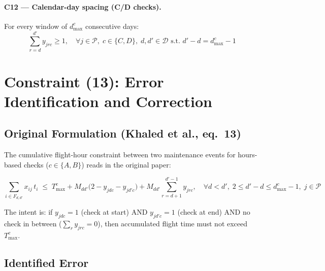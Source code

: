 \documentclass[11pt, a4paper]{article}
\theoremstyle{plain}
\theoremstyle{definition}
\theoremstyle{remark}
\newcommand{\P}{\mathcal{P}}        %
\newcommand{\D}{\mathcal{D}}        %
\begin{document}
\paragraph{C12 — Calendar-day spacing (C/D checks).}
For every window of $d_{\max}^c$ consecutive days:
\begin{equation}
  \sum_{r = d}^{d'} y_{jrc} \geq 1,
  \quad \forall j \in \P,\; c \in \{C,D\},\;
  d,d' \in \D \text{ s.t. } d' - d = d^c_{\max} - 1
  \label{eq:c12}
\end{equation}

\section{Constraint (13): Error Identification and Correction}

\subsection{Original Formulation (Khaled et al., eq.~13)}

The cumulative flight-hour constraint between two maintenance events for
hours-based checks ($c \in \{A, B\}$) reads in the original paper:

\begin{equation}
  \sum_{i \in F_{d,d'}} x_{ij}\, t_i
  \;\leq\;
  T^c_{\max}
  + M_{dd'}\bigl(2 - y_{jd c} - y_{jd'c}\bigr)
  + M_{dd'} \sum_{r = d+1}^{d'-1} y_{jrc},
  \label{eq:c13_original}
  \quad \forall d < d',\; 2 \leq d'-d \leq d^c_{\max}-1,\; j \in \P
\end{equation}

The intent is: if $y_{jdc}=1$ (check at start) AND $y_{jd'c}=1$ (check at end)
AND no check in between ($\sum_{r} y_{jrc} = 0$), then accumulated flight time
must not exceed $T^c_{\max}$.

\subsection{Identified Error}
\end{document}
